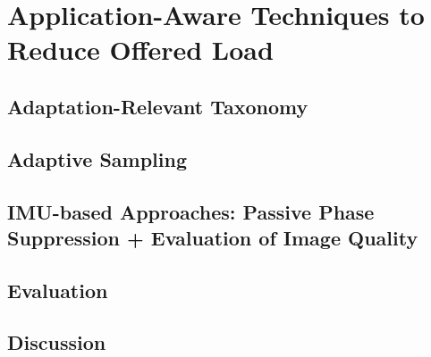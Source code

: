 \section{Application-Aware Techniques to Reduce Offered Load}
\subsection{Adaptation-Relevant Taxonomy}
\subsection{Adaptive Sampling}
\subsection{IMU-based Approaches: Passive Phase Suppression + Evaluation of Image Quality}
\subsection{Evaluation}
\subsection{Discussion}
% 
% 
